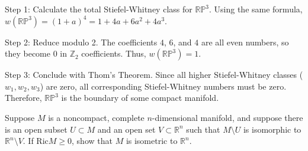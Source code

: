 \begin{solution}
Step 1: Calculate the total Stiefel-Whitney class for $\mathbb{RP}^{3}$. Using the same formula, $w(\mathbb{RP}^3) = (1+a)^4 = 1 + 4a + 6a^2 + 4a^3$.

Step 2: Reduce modulo 2. The coefficients $4$, $6$, and $4$ are all even numbers, so they become $0$ in $\mathbb{Z}_2$ coefficients. Thus, $w(\mathbb{RP}^3) = 1$.

Step 3: Conclude with Thom's Theorem. Since all higher Stiefel-Whitney classes ($w_1, w_2, w_3$) are zero, all corresponding Stiefel-Whitney numbers must be zero. Therefore, $\mathbb{RP}^3$ is the boundary of some compact manifold.
\end{solution}

\begin{exercise}
\label{geometry:2021:2}
Suppose $M$ is a noncompact, complete $n$-dimensional manifold, and suppose there is an open subset $U \subset M$ and an open set $V \subset \mathbb{R}^{n}$ such that $M \setminus U$ is isomorphic to $\mathbb{R}^{n} \setminus V$. If $\mathrm{Ric} M \geq 0$, show that $M$ is isometric to $\mathbb{R}^{n}$.
\end{exercise}

